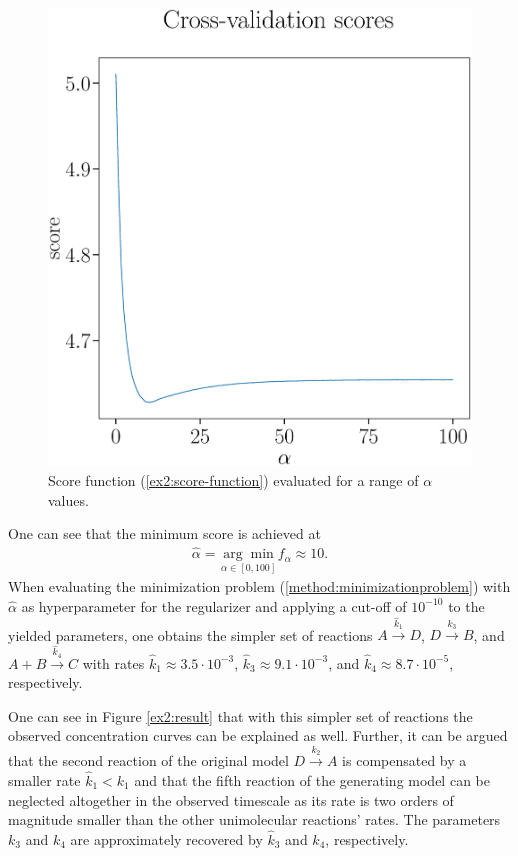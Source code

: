 \documentclass[oneside, abstracton, titlepage]{scrartcl}
\begin{document}
	\begin{figure}
		\begin{center}
			\includegraphics[width=.5\textwidth]{./figures_tex/cv_score}
		\end{center}
		\caption{Score function (\ref{ex2:score-function}) evaluated for a range of $\alpha$ values.}
		\label{ex2:score-graph}
	\end{figure}

	One can see that the minimum score is achieved at
	\begin{align}
		\hat{\alpha} = \underset{\alpha\in[0,100]}{\arg\min}f_\alpha\approx 10.
	\end{align}
	When evaluating the minimization problem (\ref{method:minimizationproblem}) with $\hat{\alpha}$ as hyperparameter for the regularizer and applying a cut-off of $10^{-10}$ to the yielded parameters, one obtains the simpler set of reactions $A\xrightarrow{\hat{k}_1}D$, $D\xrightarrow{\hat{k}_3} B$, and $A+B\xrightarrow{\hat{k}_4}C$ with rates $\hat{k}_1 \approx 3.5\cdot 10^{-3}$, $\hat{k}_3\approx 9.1\cdot 10^{-3}$, and $\hat{k}_4\approx 8.7\cdot 10^{-5}$, respectively.
	
	One can see in Figure \ref{ex2:result} that with this simpler set of reactions the observed concentration curves can be explained as well. Further, it can be argued that the second reaction of the original model $D\xrightarrow{k_2}A$ is compensated by a smaller rate $\hat{k}_1 < k_1$ and that the fifth reaction of the generating model can be neglected altogether in the observed timescale as its rate is two orders of magnitude smaller than the other unimolecular reactions' rates.
	The parameters $k_3$ and $k_4$ are approximately recovered by $\hat{k}_3$ and $\hat{k}_4$, respectively.
	
\end{document}
